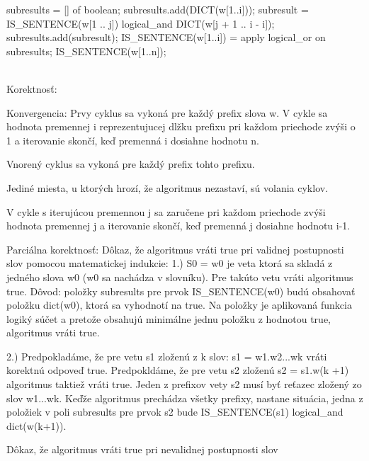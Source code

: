 \documentclass[paper=a4, fontsize=11pt]{scrartcl} %
\numberwithin{equation}{section} %
\numberwithin{figure}{section} %
\numberwithin{table}{section} %
\begin{document}
\begin{algorithmic}[1]
    		\State subresults = [] of boolean;
			\State subresults.add(DICT(w[1..i]));
					\State subresult = IS\_SENTENCE(w[1 .. j]) logical\_and DICT(w[j + 1 .. i - i]);
					\State subresults.add(subresult);
				\EndFor
			\State \Return IS\_SENTENCE(w[1..i]) = apply logical\_or on subresults;
		\EndFor
		\State \Return IS\_SENTENCE(w[1..n]);
    \EndFunction
	
\end{algorithmic}
\ \\
 
Korektnosť: 

Konvergencia:
Prvy cyklus sa vykoná pre každý prefix slova w.
V cykle sa hodnota premennej i reprezentujucej dlžku prefixu pri každom priechode zvýši o 1 a iterovanie skončí, keď premenná i dosiahne hodnotu n.

Vnorený cyklus sa vykoná pre každý prefix tohto prefixu. 

Jediné miesta, u ktorých hrozí, že algoritmus nezastaví, sú volania cyklov.

V cykle s iterujúcou premennou j sa zaručene pri každom priechode zvýši hodnota premennej j a iterovanie skončí, keď premenná j dosiahne hodnotu i-1.

Parciálna korektnosť:
Dôkaz, že algoritmus vráti true pri validnej postupnosti slov pomocou matematickej indukcie:
1.) S0 = w0 je veta ktorá sa skladá z jedného slova w0 (w0 sa nachádza v slovníku). Pre takúto vetu vráti algoritmus true. Dôvod: položky subresults pre prvok IS\_SENTENCE(w0) budú obsahovať položku dict(w0), ktorá sa vyhodnotí na true. Na položky je aplikovaná funkcia logiký súčet a pretože obsahujú minimálne jednu položku z hodnotou true, algoritmus vráti true.
	
2.) Predpokladáme, že pre vetu s1 zloženú z k slov: s1 = w1.w2...wk vráti korektnú odpoveď true.
	Predpokldáme, že pre vetu s2 zloženú s2 = s1.w(k +1) algoritmus taktiež vráti true.
	Jeden z prefixov vety s2 musí byť reťazec zložený zo slov w1...wk.
	Keďže algoritmus prechádza všetky prefixy, nastane situácia, jedna z položiek v poli subresults
	pre prvok s2 bude IS\_SENTENCE(s1) logical_and dict(w(k+1)).
	
	
Dôkaz, že algoritmus vráti true pri nevalidnej postupnosti slov

	
	
	
	
	
	
\end{document}
